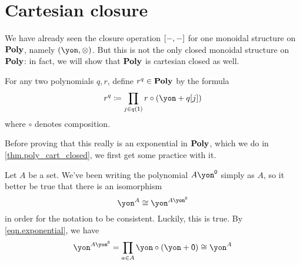 \documentclass[Book-Poly]{subfiles}
\begin{document}
\section{Cartesian closure}

We have already seen the closure operation $[-,-]$ for one monoidal structure on $\mathbf{Poly}$, namely $(\yon,\otimes)$.
But this is not the only closed monoidal structure on $\mathbf{Poly}$: in fact, we will show that $\mathbf{Poly}$ is cartesian closed as well.

For any two polynomials $q,r$, define $r^q\in\mathbf{Poly}$ by the formula
\begin{equation}\label{eqn.exponential}
  r^q\coloneqq\prod_{j\in q(\1)}r\circ(\yon+q[j])
\end{equation}
where $\circ$ denotes composition.

Before proving that this really is an exponential in $\mathbf{Poly}$, which we do in \cref{thm.poly_cart_closed}, we first get some practice with it.

\begin{example}
Let $A$ be a set. We've been writing the polynomial $A\yon^\0$ simply as $A$, so it better be true that there is an isomorphism
\[
    \yon^A \iso \yon^{A\yon^\0}
\]
in order for the notation to be consistent.
Luckily, this is true.
By \eqref{eqn.exponential}, we have
\[
    \yon^{A\yon^\0} = \prod_{a\in A} \yon \circ (\yon+\0) \iso \yon^A
\]
\end{example}
\end{document}
